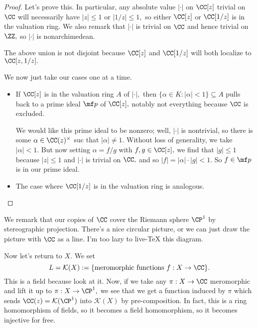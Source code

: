 \documentclass[../notes.tex]{subfiles}
\begin{document}
\begin{proof}
	Let's prove this. In particular, any absolute value $|\cdot|$ on $\CC[z]$ trivial on $\CC$ will necessarily have $|z|\le1$ or $|1/z|\le1,$ so either $\CC[z]$ or $\CC[1/z]$ is in the valuation ring. We also remark that $|\cdot|$ is trivial on $\CC$ and hence trivial on $\ZZ,$ so $|\cdot|$ is nonarchimedean.
	\begin{remark}
		The above union is not disjoint because $\CC[z]$ and $\CC[1/z]$ will both localize to $\CC[z,1/z].$
	\end{remark}
	We now just take our cases one at a time.
	\begin{itemize}
		\item If $\CC[z]$ is in the valuation ring $A$ of $|\cdot|,$ then $\{\alpha\in K:|\alpha|<1\}\subseteq A$ pulls back to a prime ideal $\mf p$ of $\CC[z],$ notably not everything because $\CC$ is excluded.
		
		We would like this prime ideal to be nonzero; well, $|\cdot|$ is nontrivial, so there is some $\alpha\in\CC(z)^\times$ suc that $|\alpha|\ne1.$ Without loss of generality, we take $|\alpha|<1.$ But now setting $\alpha=f/g$ with $f,g\in\CC[z],$ we find that $|g|\le1$ because $|z|\le1$ and $|\cdot|$ is trivial on $\CC,$ and so $|f|=|\alpha|\cdot|g|<1.$ So $f\in\mf p$ is in our prime ideal.
		\item The case where $\CC[1/z]$ is in the valuation ring is analogous.
		\qedhere
	\end{itemize}
\end{proof}
We remark that our copies of $\CC$ cover the Riemann sphere $\CP^1$ by stereographic projection. There's a nice circular picture, or we can just draw the picture with $\CC$ as a line. I'm too lazy to live-TeX this diagram.

Now let's return to $X.$ We set
\[L=\mathcal K(X):=\{\text{meromorphic functions }f:X\to\CC\}.\]
This is a field because look at it. Now, if we take any $\pi:X\to\CC$ meromorphic and lift it up to $\pi:X\to\CP^1,$ we see that we get a function induced by $\pi$ which sends $\CC(z)=\mathcal K(\CP^1)$ into $\mathcal K(X)$ by pre-composition. In fact, this is a ring homomorphism of fields, so it becomes a field homomorphism, so it becomes injective for free.
\end{document}
